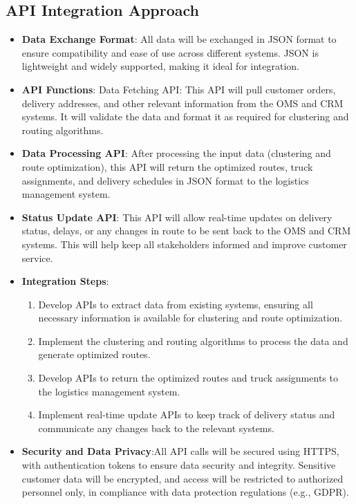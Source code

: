 \documentclass[a4paper,12pt, final]{article}
\begin{document}
\subsection{API Integration Approach}
\begin{itemize}
    \item \textbf{Data Exchange Format}: All data will be exchanged in JSON format to ensure compatibility and ease of use across different systems. JSON is lightweight and widely supported, making it ideal for integration.
    \item \textbf{API Functions}: Data Fetching API: This API will pull customer orders, delivery addresses, and other relevant information from the OMS and CRM systems. It will validate the data and format it as required for clustering and routing algorithms.
    \item \textbf{Data Processing API}: After processing the input data (clustering and route optimization), this API will return the optimized routes, truck assignments, and delivery schedules in JSON format to the logistics management system.
    \item \textbf{Status Update API}: This API will allow real-time updates on delivery status, delays, or any changes in route to be sent back to the OMS and CRM systems. This will help keep all stakeholders informed and improve customer service.
    \item \textbf{Integration Steps}:
        \begin{enumerate}
            \item Develop APIs to extract data from existing systems, ensuring all necessary information is available for clustering and route optimization.
            \item Implement the clustering and routing algorithms to process the data and generate optimized routes.
            \item Develop APIs to return the optimized routes and truck assignments to the logistics management system.
            \item Implement real-time update APIs to keep track of delivery status and communicate any changes back to the relevant systems.
        \end{enumerate}

    \item \textbf{Security and Data Privacy}:All API calls will be secured using HTTPS, with authentication tokens to ensure data security and integrity.
        Sensitive customer data will be encrypted, and access will be restricted to authorized personnel only, in compliance with data protection regulations (e.g., GDPR).

\end{itemize}
\end{document}
